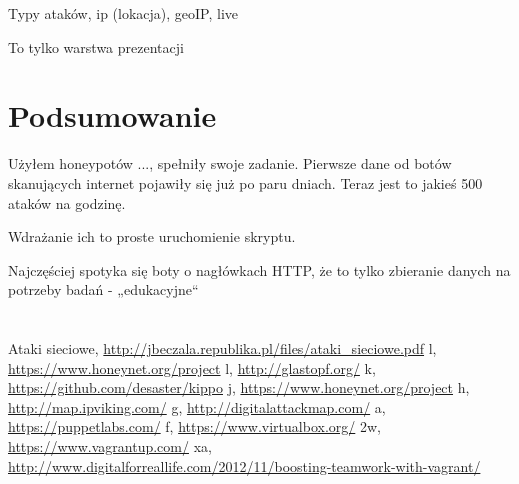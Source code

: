 \documentclass[runningheads,a4paper]{llncs}
\begin{document}
Typy ataków, ip (lokacja), geoIP, live

To tylko warstwa prezentacji
\section{Podsumowanie}
Użyłem honeypotów ..., spełniły swoje zadanie. Pierwsze dane od botów skanujących internet pojawiły się już po paru dniach. Teraz jest to jakieś 500 ataków na godzinę.

Wdrażanie ich to proste uruchomienie skryptu.

Najczęściej spotyka się boty o nagłówkach HTTP, że to tylko zbieranie danych na potrzeby badań - „edukacyjne“

\section{}
\begin{thebibliography}{1}


\bibitem{} Ataki sieciowe,
\url{http://jbeczala.republika.pl/files/ataki_sieciowe.pdf}
 l, \url{https://www.honeynet.org/project}
\bibitem{} l,
\url{http://glastopf.org/}
\bibitem{} k,
\url{https://github.com/desaster/kippo}
\bibitem{} j,
\url{https://www.honeynet.org/project}
\bibitem{} h,
\url{http://map.ipviking.com/}
\bibitem{} g,
\url{http://digitalattackmap.com/}
\bibitem{} a,
\url{https://puppetlabs.com/}
\bibitem{} f,
\url{https://www.virtualbox.org/}
\bibitem{} 2w,
\url{https://www.vagrantup.com/}
\bibitem{} xa,
\url{http://www.digitalforreallife.com/2012/11/boosting-teamwork-with-vagrant/}


\end{thebibliography}
\end{document}

